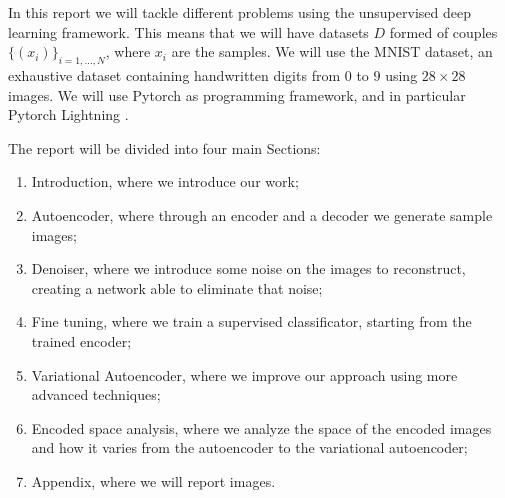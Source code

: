 In this report we will tackle different problems using the unsupervised deep learning framework. This means that we will
have datasets $D$ formed of couples $\{(x_i)\}_{i=1,\dots,N}$, where $x_i$ are the samples. We will use the MNIST dataset, 
an exhaustive dataset containing handwritten digits from $0$ to $9$ using $28\times 28$ images.
We will use Pytorch as programming framework, and in particular Pytorch Lightning \cite{falcon2019pytorch}.

The report will be divided into four main Sections:
\begin{enumerate}
    \item Introduction, where we introduce our work;
    \item Autoencoder, where through an encoder and a decoder we generate sample images;
    \item Denoiser, where we introduce some noise on the images to reconstruct, creating a network able to eliminate that noise;
    \item Fine tuning, where we train a supervised classificator, starting from the trained encoder;
    \item Variational Autoencoder, where we improve our approach using more advanced techniques;
    \item Encoded space analysis, where we analyze the space of the encoded images and how it varies from the autoencoder to the variational autoencoder;
    \item Appendix, where we will report images.
\end{enumerate}